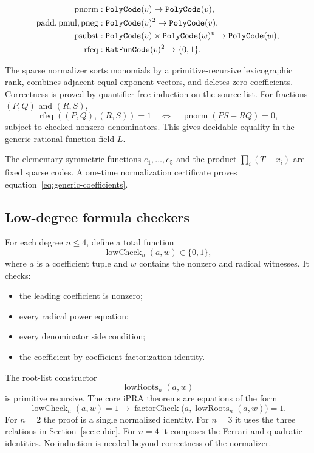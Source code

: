 \begin{align*}
 \operatorname{pnorm}&:\code{PolyCode}(v)\to\code{PolyCode}(v),\\
 \operatorname{padd},\operatorname{pmul},\operatorname{pneg}
  &:\code{PolyCode}(v)^2\to\code{PolyCode}(v),\\
 \operatorname{psubst}&:\code{PolyCode}(v)\times
   \code{PolyCode}(w)^v\to\code{PolyCode}(w),\\
 \operatorname{rfeq}&:\code{RatFunCode}(v)^2\to\{0,1\}.
\end{align*}

The sparse normalizer sorts monomials by a primitive-recursive lexicographic
rank, combines adjacent equal exponent vectors, and deletes zero coefficients.
Correctness is proved by quantifier-free induction on the source list.  For
fractions $(P,Q)$ and $(R,S)$,
\[
 \operatorname{rfeq}((P,Q),(R,S))=1
 \quad\Longleftrightarrow\quad
 \operatorname{pnorm}(PS-RQ)=0,
\]
subject to checked nonzero denominators.  This gives decidable equality in the
generic rational-function field $L$.

The elementary symmetric functions $e_1,\ldots,e_5$ and the product
$\prod_i(T-x_i)$ are fixed sparse codes.  A one-time normalization certificate
proves equation~\eqref{eq:generic-coefficients}.

\subsection{Low-degree formula checkers}

For each degree $n\le4$, define a total function
\[
 \operatorname{lowCheck}_n(a,w)\in\{0,1\},
\]
where $a$ is a coefficient tuple and $w$ contains the nonzero and radical
witnesses.  It checks:

\begin{itemize}
\item the leading coefficient is nonzero;
\item every radical power equation;
\item every denominator side condition;
\item the coefficient-by-coefficient factorization identity.
\end{itemize}

The root-list constructor
\[
 \operatorname{lowRoots}_n(a,w)
\]
is primitive recursive.  The core iPRA theorems are equations of the form
\[
 \operatorname{lowCheck}_n(a,w)=1
 \to
 \operatorname{factorCheck}
   \bigl(a,\operatorname{lowRoots}_n(a,w)\bigr)=1.
 \tag{I1}\label{eq:ipra-low}
\]
For $n=2$ the proof is a single normalized identity.  For $n=3$ it uses the
three relations in Section~\ref{sec:cubic}.  For $n=4$ it composes the Ferrari
and quadratic identities.  No induction is needed beyond correctness of the
normalizer.

